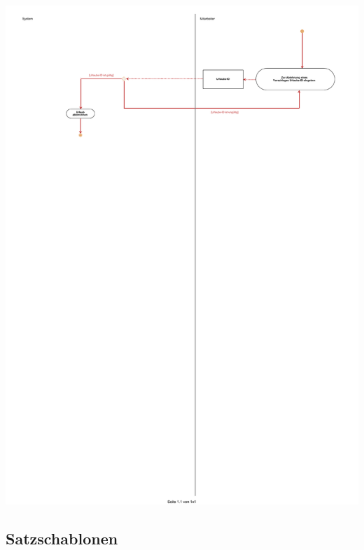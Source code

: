 \begin{center}
\includegraphics[width=0.9\linewidth]{Urlaubsvorschlag_ablehnen.pdf}
\end{center}

\subsection{Satzschablonen}

 
